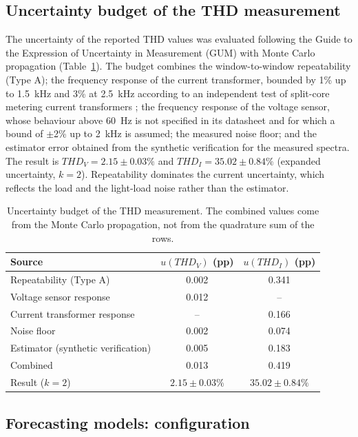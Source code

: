 \subsection*{Uncertainty budget of the THD measurement}

The uncertainty of the reported THD values was evaluated following the Guide to the Expression of Uncertainty in Measurement (GUM) \cite{jcgm100} with Monte Carlo propagation \cite{jcgm101} (Table~\ref{tab:thd_uncertainty}). The budget combines the window-to-window repeatability (Type A); the frequency response of the current transformer, bounded by 1\% up to 1.5~kHz and 3\% at 2.5~kHz according to an independent test of split-core metering current transformers \cite{oem_ct_report}; the frequency response of the voltage sensor, whose behaviour above 60~Hz is not specified in its datasheet and for which a bound of $\pm$2\% up to 2~kHz is assumed; the measured noise floor; and the estimator error obtained from the synthetic verification for the measured spectra. The result is $THD_V = 2.15 \pm 0.03\%$ and $THD_I = 35.02 \pm 0.84\%$ (expanded uncertainty, $k = 2$). Repeatability dominates the current uncertainty, which reflects the load and the light-load noise rather than the estimator.

\begin{table}[H]
\centering
\caption{Uncertainty budget of the THD measurement. The combined values come from the Monte Carlo propagation, not from the quadrature sum of the rows.}
\label{tab:thd_uncertainty}
\begin{tabular}{lcc}
\toprule
Source & $u(THD_V)$ (pp) & $u(THD_I)$ (pp) \\
\midrule
Repeatability (Type A) & 0.002 & 0.341 \\
Voltage sensor response & 0.012 & -- \\
Current transformer response & -- & 0.166 \\
Noise floor & 0.002 & 0.074 \\
Estimator (synthetic verification) & 0.005 & 0.183 \\
Combined & 0.013 & 0.419 \\
\midrule
Result ($k = 2$) & $2.15 \pm 0.03\%$ & $35.02 \pm 0.84\%$ \\
\bottomrule
\end{tabular}
\end{table}

\subsection*{Forecasting models: configuration}

